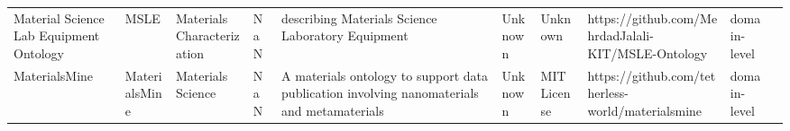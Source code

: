 \begin{tabular}{llllllllll}
                                          Material Science Lab Equipment Ontology &                    MSLE &                  Materials Characterization &                                                                                                                                                                                                                                                                                                                                                                  NaN &                                                                                                                                                                                                                                                                                                                                                      describing Materials Science Laboratory Equipment &                                                                                                            Unknown &                                      Unknown &                                                 https://github.com/MehrdadJalali-KIT/MSLE-Ontology &      domain-level \\
                                                                    MaterialsMine &           MaterialsMine &                           Materials Science &                                                                                                                                                                                                                                                                                                                                                                  NaN &                                                                                                                                                                                                                                                                                                             A materials ontology to support data publication involving nanomaterials and metamaterials &                                                                                                            Unknown &                                  MIT License &                                                  https://github.com/tetherless-world/materialsmine &      domain-level \\

\end{tabular}
